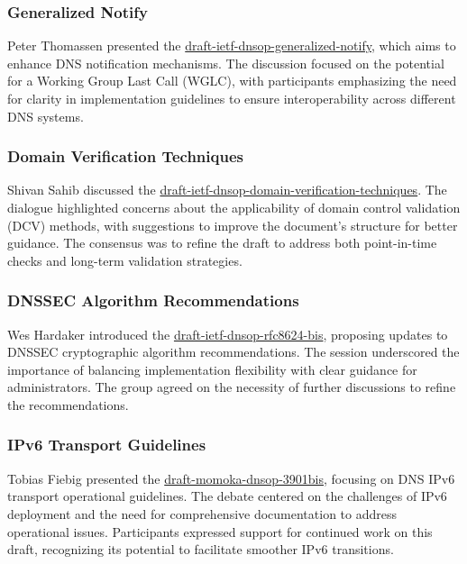 \documentclass{article}
\begin{document}
\subsubsection{Generalized Notify}
Peter Thomassen presented the \href{https://datatracker.ietf.org/doc/html/draft-ietf-dnsop-generalized-notify}{draft-ietf-dnsop-generalized-notify}, which aims to enhance DNS notification mechanisms. The discussion focused on the potential for a Working Group Last Call (WGLC), with participants emphasizing the need for clarity in implementation guidelines to ensure interoperability across different DNS systems.

\subsubsection{Domain Verification Techniques}
Shivan Sahib discussed the \href{https://datatracker.ietf.org/doc/html/draft-ietf-dnsop-domain-verification-techniques}{draft-ietf-dnsop-domain-verification-techniques}. The dialogue highlighted concerns about the applicability of domain control validation (DCV) methods, with suggestions to improve the document's structure for better guidance. The consensus was to refine the draft to address both point-in-time checks and long-term validation strategies.

\subsubsection{DNSSEC Algorithm Recommendations}
Wes Hardaker introduced the \href{https://datatracker.ietf.org/doc/html/draft-ietf-dnsop-rfc8624-bis}{draft-ietf-dnsop-rfc8624-bis}, proposing updates to DNSSEC cryptographic algorithm recommendations. The session underscored the importance of balancing implementation flexibility with clear guidance for administrators. The group agreed on the necessity of further discussions to refine the recommendations.

\subsubsection{IPv6 Transport Guidelines}
Tobias Fiebig presented the \href{https://datatracker.ietf.org/doc/html/draft-momoka-dnsop-3901bis}{draft-momoka-dnsop-3901bis}, focusing on DNS IPv6 transport operational guidelines. The debate centered on the challenges of IPv6 deployment and the need for comprehensive documentation to address operational issues. Participants expressed support for continued work on this draft, recognizing its potential to facilitate smoother IPv6 transitions.
\end{document}
